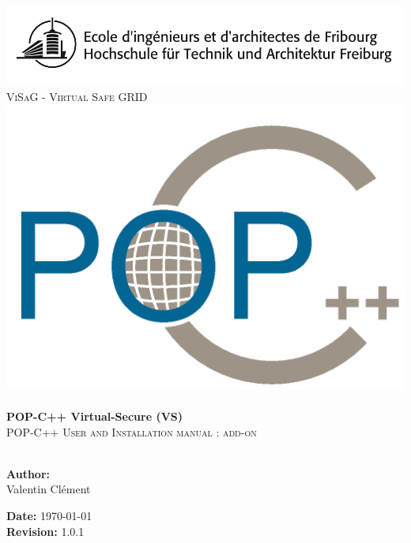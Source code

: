 
\begin{titlepage}
 
\begin{center}
\includegraphics[scale=0.3]{logo_eif.png}\\[1.5cm]
\textsc{\LARGE ViSaG - Virtual Safe GRID}\\[1.5cm]

\includegraphics[scale=0.3]{pic/logo_pop.png}\\[2cm]


\HRule \\[1cm]
{ \huge \bfseries POP-C++ Virtual-Secure (VS)}\\[0.5cm]
\textsc{\LARGE POP-C++ User and Installation manual : add-on}\\[1cm]
 
\HRule \\[5cm]
 
\begin{minipage}{0.4\textwidth}
\begin{flushleft} \large
\textbf{Author:}\\
Valentin Clément
\end{flushleft}
\end{minipage}
\begin{minipage}{0.4\textwidth}
\begin{flushright} \large
\textbf{Date:} \today \\

\textbf{Revision:} 1.0.1
\end{flushright}
\end{minipage}
 
\vfill
  
\end{center}
 
\end{titlepage}
